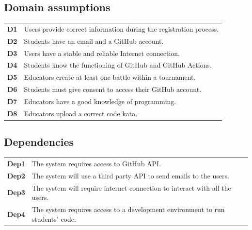 \subsection{Domain assumptions}
\begin{table}[H]
  \begin{tabularx}{\textwidth}{cX}
        \toprule
        \textbf{D1} & Users provide correct information during the registration process.\\
        \textbf{D2} & Students have an email and a GitHub account.\\
        \textbf{D3} & Users have a stable and reliable Internet connection.\\
        \textbf{D4} & Students know the functioning of GitHub and GitHub Actions.\\
        \textbf{D5} & Educators create at least one battle within a tournament.\\
        \textbf{D6} & Students must give consent to access their GitHub account.\\
        \textbf{D7} & Educators have a good knowledge of programming.\\
        \textbf{D8} & Educators upload a correct code kata.\\
        \bottomrule
  \end{tabularx}
\end{table}

\subsection{Dependencies}
\begin{table}[H]
      \begin{tabularx}{\textwidth}{cX}
            \toprule
            \textbf{Dep1}  & The system requires access to GitHub API.\\
            \textbf{Dep2}  & The system will use a third party API to send emails to the users.\\
            \textbf{Dep3}  & The system will require internet connection to interact with all the users.\\
            \textbf{Dep4}  & The system requires access to a development environment to run students' code.\\
            \bottomrule
      \end{tabularx}
\end{table}

